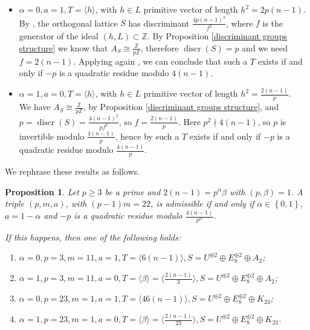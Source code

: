 \documentclass{amsart}
\newtheorem{prop}[theorem]{Proposition}
\theoremstyle{definition}
\newcommand{\IZ}{\mathbb{Z}}
\DeclareMathOperator{\discr}{discr}
\begin{document}
\begin{itemize}
\item $\alpha = 0, a = 1, T= \langle h\rangle$, with $h \in L$ primitive vector of length $h^2=2p(n-1)$.\\ By \cite[Proposition 3.6]{ghs}, the orthogonal lattice $S$ has discriminant $\frac{4p(n-1)^2}{f^2}$, where $f$ is the generator of the ideal $(h,L) \subset \IZ$. By Proposition \ref{discriminant groups structure} we know that $A_S \cong \frac{\IZ}{p \IZ}$, therefore $\discr (S) = p$ and we need $f = 2(n-1)$. Applying again \cite[Proposition 3.6]{ghs}, we can conclude that such a $T$ exists if and only if $-p$ is a quadratic residue modulo $4(n-1)$.
\item $\alpha = 1, a = 0, T= \langle h\rangle$, with $h \in L$ primitive vector of length $h^2=\frac{2(n-1)}{p}$.\\ We have $A_S \cong \frac{\IZ}{p \IZ}$, by Proposition \ref{discriminant groups structure}, and $p = \discr (S) = \frac{4(n-1)^2}{pf^2}$, so $f=\frac{2(n-1)}{p}$. Here $p^2 \nmid 4(n-1)$, so $p$ is invertible modulo $\frac{4(n-1)}{p}$, hence by \cite[Proposition 3.6]{ghs} such a $T$ exists if and only if $-p$ is a quadratic residue modulo $\frac{4(n-1)}{p}$.
\end{itemize}

We rephrase these results as follows.

\begin{prop}\label{rkT=1bis}
Let $p \geq 3$ be a prime and $2(n-1) = p^\alpha \beta$ with $(p, \beta) = 1$. A triple $(p,m,a)$, with $(p-1)m = 22$, is admissible if and only if $\alpha \in \left\{ 0, 1 \right\}$, $a = 1-\alpha$ and $-p$ is a quadratic residue modulo $\frac{4(n-1)}{p^\alpha}$.

If this happens, then one of the following holds:
\begin{enumerate}
\item $\alpha = 0, p=3, m=11, a=1, T=\langle 6(n-1)\rangle, S=U^{\oplus 2}\oplus E_8^{\oplus 2}\oplus A_2$;
\item $\alpha = 1, p=3, m=11, a=0, T= \langle \beta \rangle= \langle \frac{2(n-1)}{3}\rangle, S=U^{\oplus 2}\oplus E_8^{\oplus 2}\oplus A_2$;
\item $\alpha = 0, p=23, m=1, a=1, T =\langle 46(n-1)\rangle, S=U^{\oplus 2}\oplus E_8^{\oplus 2}\oplus K_{23}$;
\item $\alpha = 1, p=23, m=1, a=0, T = \langle \beta \rangle= \langle \frac{2(n-1)}{23}\rangle, S=U^{\oplus 2}\oplus E_8^{\oplus 2}\oplus K_{23}$.
\end{enumerate}
\end{prop}
\end{document}

